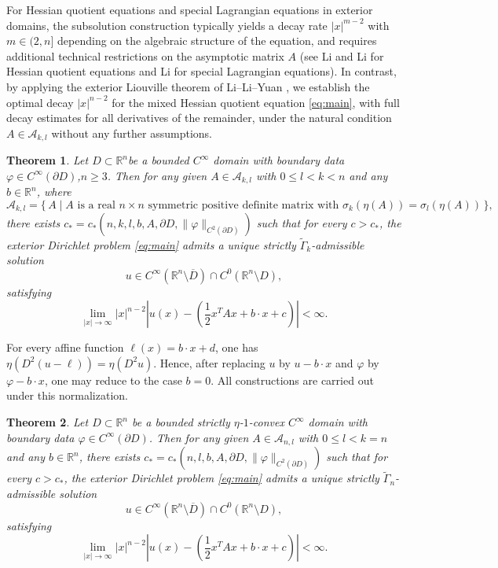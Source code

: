 \documentclass[reqno,a4paper]{amsart}
\numberwithin{equation}{section}
\newtheorem{theorem}{Theorem}[section]
\begin{document}
	For Hessian quotient equations and special Lagrangian equations in exterior domains, the subsolution construction typically yields a decay rate $|x|^{m-2}$ with $m\in(2,n]$ depending on the algebraic structure of the equation, and requires additional technical restrictions on the asymptotic matrix $A$ (see Li and Li \cite{LL18} for Hessian quotient equations and Li \cite{Li19} for special Lagrangian equations). In contrast, by applying the exterior Liouville theorem of Li--Li--Yuan \cite{LLY20}, we establish the optimal decay $|x|^{n-2}$ for the mixed Hessian quotient equation \eqref{eq:main}, with full decay estimates for all derivatives of the remainder, under the natural condition $A\in\mathcal{A}_{k,l}$ without any further assumptions.
	
	\begin{theorem}
		Let $D \subset \mathbb{R}^n$be a bounded $C^\infty$ domain with boundary data $\varphi \in C^\infty(\partial D)$,$n\geq3$. Then for any given $A \in \mathcal{A}_{k,l}$ with  $0\leq l<k<n$ and any $b\in \mathbb{R}^n$, where
		\[
		\mathcal{A}_{k,l} = \{\, A \mid A \text{ is a real } n\times n \text{ symmetric positive definite matrix with } \sigma_k(\eta(A)) = \sigma_l(\eta(A)) \,\},
		\]
		there exists $c_* = c_*(n,k,l,b,A,\partial D,\|\varphi\|_{C^2(\partial D)})$ such that for every $c > c_*$, the exterior Dirichlet problem \eqref{eq:main}	admits a unique strictly $\widetilde{\Gamma}_k$-admissible solution
		\[
		u \in C^\infty(\mathbb{R}^n \setminus \overline{D}) \cap C^0(\mathbb{R}^n \setminus D),
		\]
		satisfying
		\[
		\lim_{|x| \to \infty} |x|^{n-2} \left| u(x) - \left( \frac12 x^T A x + b \cdot x + c \right) \right| < \infty.
		\]
		
	\end{theorem}
	For every affine function $\ell(x)=b\cdot x+d$, one has $\eta(D^2(u-\ell))=\eta(D^2 u)$. Hence, after replacing $u$ by $u-b\cdot x$ and $\varphi$ by $\varphi-b\cdot x$, one may reduce to the case $b=0$. All constructions  are carried out under this normalization.
	
	\begin{theorem}
		Let $D \subset \mathbb{R}^n$ be a bounded strictly
		$\eta$-$1$-convex $C^\infty$ domain with boundary data $\varphi \in C^\infty(\partial D)$. Then for any given $A \in \mathcal{A}_{n,l}$ with  $0\leq l<k=n$ and any $b\in \mathbb{R}^n$, there exists $c_* = c_*(n,l,b,A,\partial D,\|\varphi\|_{C^2(\partial D)})$ such that for every $c > c_*$, the exterior Dirichlet problem  \eqref{eq:main} admits a unique strictly $\widetilde{\Gamma}_n$-admissible solution
		\[
		u \in C^\infty(\mathbb{R}^n \setminus \overline{D}) \cap C^0(\mathbb{R}^n \setminus D),
		\]
		satisfying
		\[
		\lim_{|x| \to \infty} |x|^{n-2} \left| u(x) - \left( \frac12 x^T A x + b \cdot x + c \right) \right| < \infty.
		\]
	\end{theorem}	
	
\end{document}
